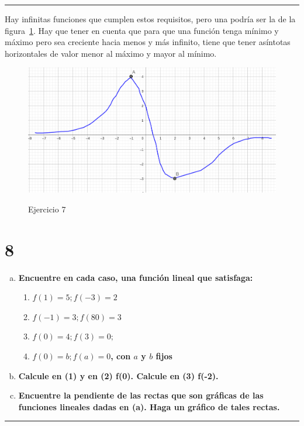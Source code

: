 \documentclass{article}
\begin{document}
\vspace{1em}
\hrule
\vspace{1em}

Hay infinitas funciones que cumplen estos requisitos, pero una podría ser la de la figura~\ref{fig:7}. Hay que tener en cuenta que para que una función tenga mínimo y máximo pero sea creciente hacia menos y más infinito, tiene que tener asíntotas horizontales de valor menor al máximo y mayor al mínimo.

\begin{figure}[ht]
\caption{Ejercicio 7}
\includegraphics[scale=0.7]{../img/guide_01/ex_07.png} 
\centering
\label{fig:7}
\end{figure}

\section*{8}
\label{sec:8}

\begin{enumerate}[(a)]

\item \textbf{Encuentre en cada caso, una función lineal que satisfaga:}

\begin{enumerate}
\item \textbf{$f(1) = 5; f(-3) = 2$}
\item \textbf{$f(-1) = 3; f(80) = 3$}
\item \textbf{$f(0) = 4; f(3) = 0;$}
\item \textbf{$f(0) = b; f(a) = 0$, con $a$ y $b$ fijos}
\end{enumerate}

\item \textbf{Calcule en (1) y en (2) f(0). Calcule en (3) f(-2).}

\item \textbf{Encuentre la pendiente de las rectas que son gráficas de las funciones lineales dadas en (a). Haga un gráfico de tales rectas.}

\end{enumerate}
\hrule
\end{document}
